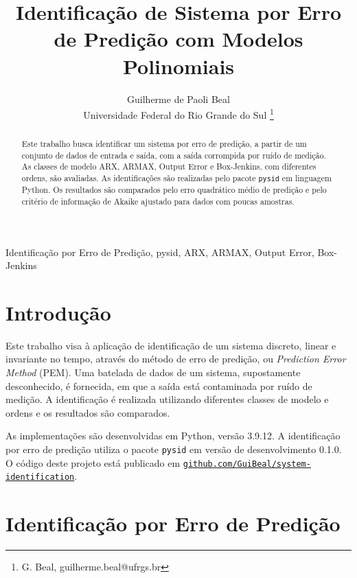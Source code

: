 \documentclass{ppgeesa}
\begin{document}

\title{Identificação de Sistema por Erro de Predição com Modelos Polinomiais}
\author{Guilherme de Paoli Beal
  \\
  {\small Universidade Federal do Rio Grande do Sul}
  \thanks{G. Beal, guilherme.beal@ufrgs.br}
}
\maketitle
\thispagestyle{empty}\pagestyle{empty}

\begin{abstract}
  Este trabalho busca identificar um sistema por erro de predição, a partir de um conjunto de dados de entrada e saída, com a saída corrompida por ruído de medição.
  As classes de modelo ARX, ARMAX, Output Error e Box-Jenkins, com diferentes ordens, são avaliadas.
  As identificações são realizadas pelo pacote \texttt{pysid} em linguagem Python.
  Os resultados são comparados pelo erro quadrático médio de predição e pelo critério de informação de Akaike ajustado para dados com poucas amostras.
\end{abstract}

\begin{IEEEkeywords}
  Identificação por Erro de Predição, pysid, ARX, ARMAX, Output Error, Box-Jenkins
\end{IEEEkeywords}

\section{Introdução}

Este trabalho visa à aplicação de identificação de um sistema discreto, linear e invariante no tempo, através do método de erro de predição, ou \emph{Prediction Error Method} (PEM).
Uma batelada de dados de um sistema, supostamente desconhecido, é fornecida, em que a saída está contaminada por ruído de medição.
A identificação é realizada utilizando diferentes classes de modelo e ordens e os resultados são comparados.

As implementações são desenvolvidas em Python, versão 3.9.12.
A identificação por erro de predição utiliza o pacote \texttt{pysid} em versão de desenvolvimento 0.1.0.
O código deste projeto está publicado em \href{https://github.com/GuiBeal/system-identification}{\texttt{github.com/GuiBeal/system-identification}}.

\section{Identificação por Erro de Predição}
\end{document}
